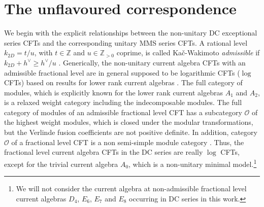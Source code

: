 \documentclass[a4paper,12pt]{article}
\begin{document}
\section{The unflavoured correspondence}\label{unflavoured_correspondence}

We begin with the explicit relationships between the non-unitary DC exceptional series CFTs and the corresponding unitary MMS series CFTs. A rational level $k_{2D}=t/u$, with $t\in\mathbb{Z}$ and $u\in\mathbb{Z}_{>0}$ coprime, is called Ka\v c-Wakimoto \textit{admissible} if $k_{2D}+h^\vee\geq h^\vee/u$ \cite{Kac:1988qc}. Generically, the non-unitary current algebra CFTs with an admissible fractional level are in general supposed to be logarithmic CFTs ($\log$ CFTs) based on results for lower rank current algebras \cite{Ridout:2008nh, Creutzig:2012sd, Creutzig:2013hma, Creutzig:2013yca}. The full category of modules, which is explicitly known for the lower rank current algebras $A_1$ and $A_2$, is a relaxed weight category including the indecomposable modules. The full category of modules of an admissible fractional level CFT has a subcategory $\mathcal{O}$ of the highest weight modules, which is closed under the modular transformations, but the Verlinde fusion coefficients are not positive definite. In addition, category $\mathcal{O}$ of a fractional level CFT is a non semi-simple module category \cite{Kawasetsu:2019att, Kawasetsu:2021qls}. Thus, the fractional level current algebra CFTs in the DC series are really $\log$ CFTs, except for the trivial current algebra $A_0$, which is a non-unitary minimal model.\footnote{We will not consider the current algebra at non-admissible fractional level current algebras $D_4$, $E_6$, $E_7$ and $E_8$ occurring in DC series in this work.}
\end{document}
